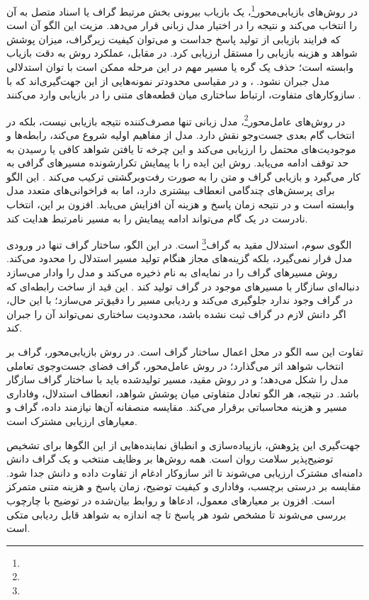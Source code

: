 در روش‌های بازیابی‌محور\footnote{}، یک بازیاب بیرونی بخش مرتبط گراف یا اسناد متصل به آن را انتخاب می‌کند و نتیجه را در اختیار مدل زبانی قرار می‌دهد. مزیت این الگو آن است که فرایند بازیابی از تولید پاسخ جداست و می‌توان کیفیت زیرگراف، میزان پوشش شواهد و هزینه بازیابی را مستقل ارزیابی کرد. در مقابل، عملکرد روش به دقت بازیاب وابسته است؛ حذف یک گره یا مسیر مهم در این مرحله ممکن است با توان استدلالی مدل جبران نشود. ،  و در مقیاسی محدودتر  نمونه‌هایی از این جهت‌گیری‌اند که با سازوکارهای متفاوت، ارتباط ساختاری میان قطعه‌های متنی را در بازیابی وارد می‌کنند \cite{he2024gretriever,gutierrez2025hipporag2,zhuang2026linearrag}.

در روش‌های عامل‌محور\footnote{}، مدل زبانی تنها مصرف‌کننده نتیجه بازیابی نیست، بلکه در انتخاب گام بعدی جست‌وجو نقش دارد. مدل از مفاهیم اولیه شروع می‌کند، رابطه‌ها و موجودیت‌های محتمل را ارزیابی می‌کند و این چرخه تا یافتن شواهد کافی یا رسیدن به حد توقف ادامه می‌یابد. روش  این ایده را با پیمایش تکرارشونده مسیرهای گرافی به کار می‌گیرد و  بازیابی گراف و متن را به صورت رفت‌وبرگشتی ترکیب می‌کند \cite{sun2024think,ma2025tog2}. این الگو برای پرسش‌های چندگامی انعطاف بیشتری دارد، اما به فراخوانی‌های متعدد مدل وابسته است و در نتیجه زمان پاسخ و هزینه آن افزایش می‌یابد. افزون بر این، انتخاب نادرست در یک گام می‌تواند ادامه پیمایش را به مسیر نامرتبط هدایت کند.

الگوی سوم، استدلال مقید به گراف\footnote{} است. در این الگو، ساختار گراف تنها در ورودی مدل قرار نمی‌گیرد، بلکه گزینه‌های مجاز هنگام تولید مسیر استدلال را محدود می‌کند. روش  مسیرهای گراف را در نمایه‌ای به نام  ذخیره می‌کند و مدل را وادار می‌سازد دنباله‌ای سازگار با مسیرهای موجود در گراف تولید کند \cite{luo2025gcr}. این قید از ساخت رابطه‌ای که در گراف وجود ندارد جلوگیری می‌کند و ردیابی مسیر را دقیق‌تر می‌سازد؛ با این حال، اگر دانش لازم در گراف ثبت نشده باشد، محدودیت ساختاری نمی‌تواند آن را جبران کند.

تفاوت این سه الگو در محل اعمال ساختار گراف است. در روش بازیابی‌محور، گراف بر انتخاب شواهد اثر می‌گذارد؛ در روش عامل‌محور، گراف فضای جست‌وجوی تعاملی مدل را شکل می‌دهد؛ و در روش مقید، مسیر تولیدشده باید با ساختار گراف سازگار باشد. در نتیجه، هر الگو تعادل متفاوتی میان پوشش شواهد، انعطاف استدلال، وفاداری مسیر و هزینه محاسباتی برقرار می‌کند. مقایسه منصفانه آن‌ها نیازمند داده، گراف و معیارهای ارزیابی مشترک است.

جهت‌گیری این پژوهش، بازپیاده‌سازی و انطباق نماینده‌هایی از این الگوها برای تشخیص توضیح‌پذیر سلامت روان است. همه روش‌ها بر وظایف منتخب  و یک گراف دانش دامنه‌ای مشترک ارزیابی می‌شوند تا اثر سازوکار ادغام از تفاوت داده و دانش جدا شود. مقایسه بر درستی برچسب، وفاداری و کیفیت توضیح، زمان پاسخ و هزینه متنی متمرکز است. افزون بر معیارهای معمول، ادعاها و روابط بیان‌شده در توضیح با چارچوب  بررسی می‌شوند تا مشخص شود هر پاسخ تا چه اندازه به شواهد قابل ردیابی متکی است.

